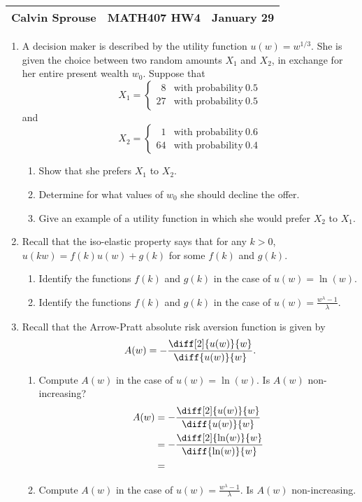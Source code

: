 \documentclass[a4paper, 12pt]{config/homework}
\begin{document}
\noindent
\begin{tabularx}{\textwidth}{>{\centering\arraybackslash}X>{\centering\arraybackslash}X>{\centering\arraybackslash}X}
Calvin Sprouse & MATH407 HW4 & 2024 January 29\\
\midrule
\end{tabularx}

\begin{enumerate}
\item A decision maker is described by the utility function \(u(w)=w^{1/3}\). She is given the choice between two random amounts \(X_1\) and \(X_2\), in exchange for her entire present wealth \(w_0\). Suppose that
\[X_1 = \begin{cases}
\phantom{0}8 & \text{with probability}\ 0.5 \\
27 & \text{with probability}\ 0.5
\end{cases}\] and
\[X_2 = \begin{cases}
\phantom{0}1 & \text{with probability}\ 0.6 \\
64 & \text{with probability}\ 0.4
\end{cases}\]
\begin{enumerate}[label=(\alph*)]
\item Show that she prefers \(X_1\) to \(X_2\).


\item Determine for what values of \(w_0\) she should decline the offer.


\item Give an example of a utility function in which she would prefer \(X_2\) to \(X_1\).


\end{enumerate}
\item Recall that the iso-elastic property says that for any \(k > 0\), \(u(kw) = f(k)u(w) + g(k)\) for some \(f(k)\) and \(g(k)\).
\begin{enumerate}[label=(\alph*)]
\item Identify the functions \(f(k)\) and \(g(k)\) in the case of \(u(w)=\ln(w)\).


\item Identify the functions \(f(k)\) and \(g(k)\) in the case of \(u(w)=\frac{w^\lambda - 1}{\lambda}\).


\end{enumerate}
\item Recall that the Arrow-Pratt absolute risk aversion function is given by
\[A(w) = -\frac{\diff[2]{u(w)}{w}}{\diff{u(w)}{w}}.\]
\begin{enumerate}[label=(\alph*)]
\item Compute \(A(w)\) in the case of \(u(w)=\ln(w)\). Is \(A(w)\) non-increasing?
\begin{align*}
A(w) &= -\frac{\diff[2]{u(w)}{w}}{\diff{u(w)}{w}}
\\&= -\frac{\diff[2]{\ln(w)}{w}}{\diff{\ln(w)}{w}}
\\&=
\end{align*}

\item Compute \(A(w)\) in the case of \(u(w)=\frac{w^{\lambda} - 1}{\lambda}\). Is \(A(w)\) non-increasing.


\end{enumerate}
\end{enumerate}
\end{document}
